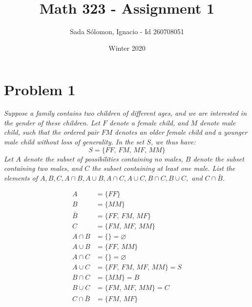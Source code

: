 \documentclass{article}
\title{Math 323
	- Assignment 1}
\author{Sada S\'{o}lomon, Ignacio - Id 260708051}
\date{Winter 2020}  %
\begin{document}
\clearpage\maketitle
\thispagestyle{empty}
\vspace{2cm}

\newpage
\setcounter{page}{1}
\cfoot{\thepage}

\pagebreak

\section*{Problem 1}
	\emph{Suppose a family contains two children of different ages, and we are interested in the gender of these children. Let $F$ denote a female child, and $M$ denote male child, such that the ordered pair $FM$ denotes an older female child and a younger male child without loss of generality. In the set $S$, we thus have: $$ S = \{ FF, \, FM, \, MF, \, MM \}$$ Let $A$ denote the subset of possibilities containing no males, $B$ denote the subset containing two males, and $C$ the subset containing at least one male. List the elements of $A, B, C, A \cap B, A \cup B, A \cap C, A \cup C, B \cap C, B \cup C,$ and $C \cap \bar{B}$. }
	
	\begin{sol}
		\vspace{-1cm}
		\begin{align*}
			A &= \{ FF \} \\
			B &= \{ MM \} \\
			\bar{B} &= \{ FF, \, FM, \, MF\} \\
			C &= \{ FM, \, MF, \, MM \} \\
			A\cap B &= \{  \} = \varnothing \\
			A \cup B &= \{ FF, \, MM\} \\
			A \cap C &= \{ \} = \varnothing \\
			A \cup C &= \{ FF, \, FM, \, MF, \, MM\} = S \\
			B \cap C &= \{ MM \} = B \\
			B \cup C &= \{ FM, \, MF, \, MM \} = C \\
			C \cap \bar{B} &= \{ FM, \, MF\}
		\end{align*}
	\end{sol}
\pagebreak
\end{document}
